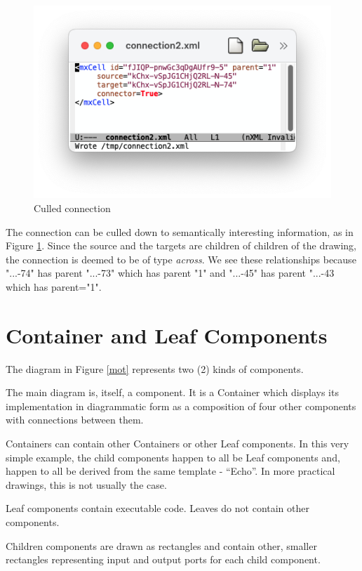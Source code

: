\documentclass[10pt,anonymous,review]{acmart}
\begin{document}
\begin{figure}
    \includegraphics[trim=2cm 2cm 2cm 1.7cm, clip, scale=0.4]{./media/connection2.png}
    \caption{Culled connection}
    \label{connection2}
\end{figure}
The connection can be culled down to semantically interesting information, as in Figure \ref{connection2}.
Since the source and the targets are children of children of the drawing, the connection is deemed to be of type \emph{across}.
We see these relationships because "...-74" has parent "...-73" which has parent "1" and "...-45" has parent "...-43 which has parent="1". 


\section{Container and Leaf Components} \label{containerleaf}
The diagram in Figure \ref{mot} represents two (2) kinds of components.

The main diagram is, itself, a component. It is a Container which displays its implementation in diagrammatic form as a composition of four other components with connections between them.

Containers can contain other Containers or other Leaf components. In this very simple example, the child components happen to all be Leaf components and, happen to all be derived from the same template - “Echo”. In more practical drawings, this is not usually the case.

Leaf components contain executable code. Leaves do not contain other components.

Children components are drawn as rectangles and contain other, smaller rectangles representing input and output ports for each child component.
\end{document}
